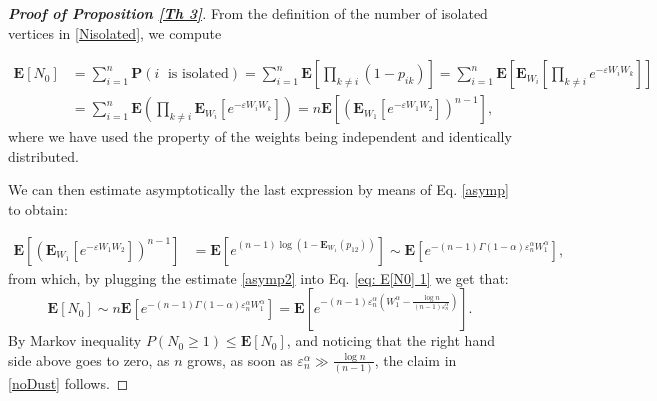 \documentclass[11pt, reqno]{amsart}
\numberwithin{equation}{section}
\theoremstyle{plain} %
\theoremstyle{definition} %
\newcommand{\eps}{\varepsilon}
\newcommand{\E}{\mathbf{E}}
\begin{document}
{%

\begin{proof}[{\bf Proof of Proposition \ref{Th 3}}]
From the definition of the number of isolated vertices in \eqref{Nisolated}, we compute

\begin{equation} \label{eq: E[N0] 1}
\begin{split}
    \mathbf{E} \left[  N_0 \right]  &= \sum_{i=1}^n \mathbf{P} (i \; {\text{ is  isolated}})  =  \sum_{i=1}^n \E \left[ \prod_{k \neq i} (1-p_{ik} ) \right] = \sum_{i=1}^n \E \left[ \E_{W_i}\left[\prod_{k \neq i} e^{-\eps W_i W_k}\right] \right] \\
    &= \sum_{i=1}^n \E\left( \prod_{k\neq i}\E_{W_i} \left[  e^{-\eps W_i W_k} \right] \right) = n \E\left[ \left(\E_{W_1}[e^{-\eps W_1 W_2}] \right)^{n-1}\right],
\end{split}
\end{equation}
where we have used the property of the weights being independent and identically distributed.

We can then estimate asymptotically the last expression by means of Eq. \eqref{asymp} to obtain:

\begin{align}\label{asymp2}
\E\left[ \left(\E_{W_1}[e^{-\eps W_1 W_2}] \right)^{n-1}\right]&=\E\left[e^{(n-1)\log(1- 
\E_{W_1}(p_{12}))}\right]\sim \E\left[e^{-(n-1)\Gamma(1-\alpha)\eps_n^\alpha W_1^{\alpha}}\right],%
\end{align}
from which, by plugging the estimate \eqref{asymp2} into Eq. \eqref{eq: E[N0] 1} we get that:
$$\E[N_0]\sim n\E\left[e^{-(n-1)\Gamma(1-\alpha)\eps_n^\alpha W_1^{\alpha}}\right]=
\E\left[e^{-(n-1)\eps_n^\alpha\left(W_1^\alpha-\frac{\log n}{(n-1)\eps_n^{\alpha}}\right)}\right].$$
By Markov inequality $P(N_0\geq 1)\leq \E[N_0]$, and noticing that the right hand side above goes to zero, as $n$ grows, as soon 
as $\eps_n^{\alpha}\gg \frac{\log n}{(n-1)}$, 
the claim in \eqref{noDust} follows.
\end{proof}

}
\end{document}
